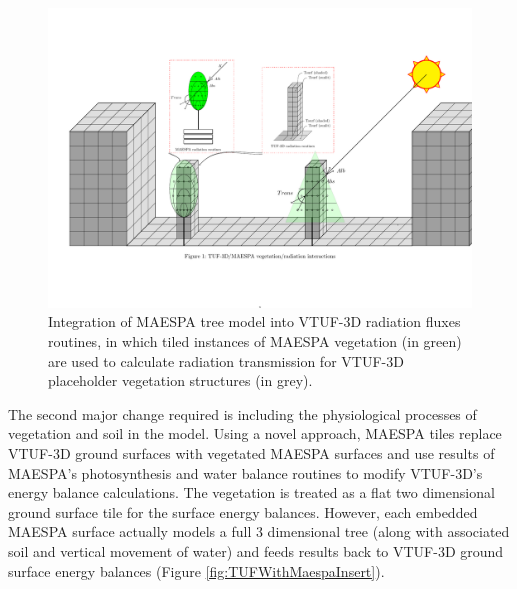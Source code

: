 \documentclass[final,3p,times,authoryear]{elsarticle}
\begin{document}
\begin{figure}[!htbp]
 \includegraphics[trim = 15mm 41mm 0mm 31mm, clip, scale=0.45]{images/TUFWithMaespaVegRadiation.pdf}  
 \caption{Integration of MAESPA tree model into VTUF-3D radiation fluxes routines, in which tiled instances of MAESPA vegetation (in green) are used to calculate radiation transmission for VTUF-3D placeholder vegetation structures (in grey)\label{fig:TUFWithMaespaVegRadiation}.}
\end{figure}

The second major change required is including the physiological processes of vegetation and soil in the model. Using a novel approach, MAESPA tiles replace VTUF-3D ground surfaces with vegetated MAESPA surfaces and use results of MAESPA’s photosynthesis and water balance routines to modify VTUF-3D's energy balance calculations. The vegetation is treated as a flat two dimensional ground surface tile for the surface energy balances. However, each embedded MAESPA surface actually models a full 3 dimensional tree (along with associated soil and vertical movement of water) and feeds results back to VTUF-3D ground surface energy balances (Figure \ref{fig:TUFWithMaespaInsert}).
\end{document}
